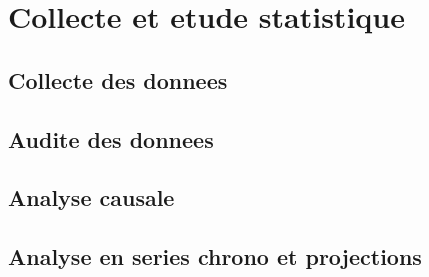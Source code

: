 \chapter{Collecte et etude statistique}
	\section{Collecte des donnees}
	\section{Audite des donnees}
	\section{Analyse causale}
	\section{Analyse en series chrono et projections}